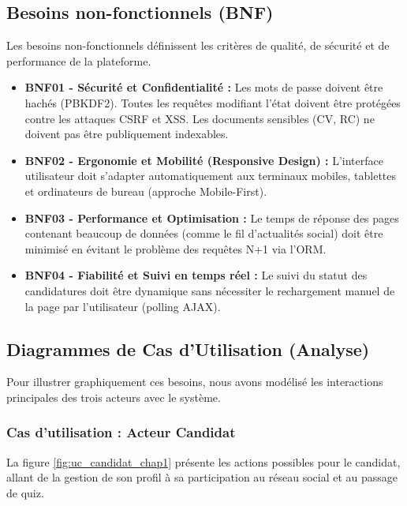 \subsection{Besoins non-fonctionnels (BNF)}
Les besoins non-fonctionnels définissent les critères de qualité, de sécurité et de performance de la plateforme.
\begin{itemize}
    \item \textbf{BNF01 - Sécurité et Confidentialité :} Les mots de passe doivent être hachés (PBKDF2). Toutes les requêtes modifiant l'état doivent être protégées contre les attaques CSRF et XSS. Les documents sensibles (CV, RC) ne doivent pas être publiquement indexables.
    \item \textbf{BNF02 - Ergonomie et Mobilité (Responsive Design) :} L'interface utilisateur doit s'adapter automatiquement aux terminaux mobiles, tablettes et ordinateurs de bureau (approche Mobile-First).
    \item \textbf{BNF03 - Performance et Optimisation :} Le temps de réponse des pages contenant beaucoup de données (comme le fil d'actualités social) doit être minimisé en évitant le problème des requêtes N+1 via l'ORM.
    \item \textbf{BNF04 - Fiabilité et Suivi en temps réel :} Le suivi du statut des candidatures doit être dynamique sans nécessiter le rechargement manuel de la page par l'utilisateur (polling AJAX).
\end{itemize}

\subsection{Diagrammes de Cas d'Utilisation (Analyse)}
Pour illustrer graphiquement ces besoins, nous avons modélisé les interactions principales des trois acteurs avec le système.

\subsubsection{Cas d'utilisation : Acteur Candidat}
La figure \ref{fig:uc_candidat_chap1} présente les actions possibles pour le candidat, allant de la gestion de son profil à sa participation au réseau social et au passage de quiz.

